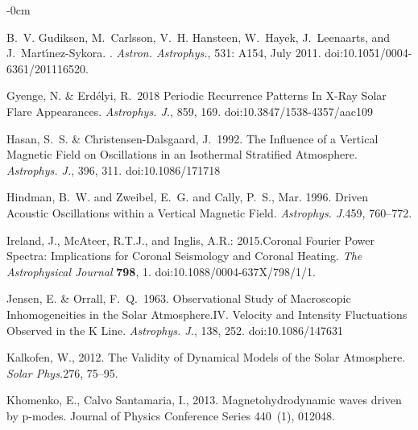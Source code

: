 \documentclass[physics,article,submit,pdftex,moreauthors]{Definitions/mdpi}
\newcommand{\aap}{{\it Astron. Astrophys.}}
\newcommand{\apj}{{\it Astrophys. J.}}
\newcommand{\solphys}{{\it Solar Phys.}}
\begin{document}
\begin{adjustwidth}{-\extralength}{0cm}
\begin{thebibliography}{999}
B.~V. {Gudiksen}, M.~{Carlsson}, V.~H. {Hansteen}, W.~{Hayek}, J.~{Leenaarts},
  and J.~{Mart{\'{\i}}nez-Sykora}.
.
\newblock \emph{\aap}, 531: A154, July 2011.
\newblock doi:10.1051/0004-6361/201116520.


 Gyenge, N. \& Erd{\'e}lyi, R.\ 2018 {Periodic Recurrence Patterns In X-Ray Solar Flare Appearances}. \apj, 859, 169. doi:10.3847/1538-4357/aac109

 Hasan, S.~S. \& Christensen-Dalsgaard, J.\ 1992. {The Influence of a Vertical Magnetic Field on Oscillations in an Isothermal Stratified Atmosphere}. \apj, 396, 311. doi:10.1086/171718



{Hindman}, B.~W. and {Zweibel}, E.~G. and {Cally}, P.~S., Mar. 1996. {Driven Acoustic Oscillations within a Vertical Magnetic Field}. \apj 459, 760--772.

Ireland, J., McAteer, R.T.J., and Inglis, A.R.: 2015.{Coronal Fourier Power Spectra: Implications for Coronal Seismology and Coronal Heating}. {\it The Astrophysical Journal} {\bf 798}, 1. doi:10.1088/0004-637X/798/1/1.



 Jensen, E. \& Orrall, F.~Q.\ 1963. {Observational Study of Macroscopic Inhomogeneities in the Solar Atmosphere.IV. Velocity and Intensity Fluctuations Observed in the K Line.} \apj, 138, 252. doi:10.1086/147631


{Kalkofen}, W., 2012. {The Validity of Dynamical Models of the Solar
  Atmosphere}. \solphys 276, 75--95.

{Khomenko}, E., {Calvo Santamaria}, I., 2013. {Magnetohydrodynamic waves driven
  by p-modes}. Journal of Physics Conference Series 440~(1), 012048.



\end{thebibliography}
\end{adjustwidth}
\end{document}
